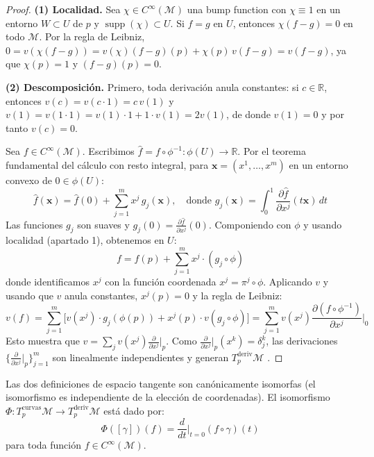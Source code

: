 \begin{proof}
\textbf{(1) Localidad.} Sea $\chi \in C^\infty(\mathcal{M})$ una bump function con $\chi \equiv 1$ en un entorno $W \subset U$ de $p$ y $\operatorname{supp}(\chi) \subset U$. Si $f = g$ en $U$, entonces $\chi(f - g) = 0$ en todo $\mathcal{M}$. Por la regla de Leibniz, $0 = v(\chi(f-g)) = v(\chi)(f-g)(p) + \chi(p) \, v(f-g) = v(f-g)$, ya que $\chi(p) = 1$ y $(f-g)(p) = 0$.

\textbf{(2) Descomposición.} Primero, toda derivación anula constantes: si $c \in \mathbb{R}$, entonces $v(c) = v(c \cdot 1) = c \, v(1)$ y $v(1) = v(1 \cdot 1) = v(1) \cdot 1 + 1 \cdot v(1) = 2v(1)$, de donde $v(1) = 0$ y por tanto $v(c) = 0$.

Sea $f \in C^\infty(\mathcal{M})$. Escribimos $\hat{f} = f \circ \phi^{-1}: \phi(U) \to \mathbb{R}$. Por el teorema fundamental del cálculo con resto integral, para $\mathbf{x} = (x^1, \ldots, x^m)$ en un entorno convexo de $0 \in \phi(U)$:
\[
\hat{f}(\mathbf{x}) = \hat{f}(0) + \sum_{j=1}^{m} x^j \, g_j(\mathbf{x}), \quad \text{donde } g_j(\mathbf{x}) = \int_0^1 \frac{\partial \hat{f}}{\partial x^j}(t\mathbf{x}) \, dt
\]
Las funciones $g_j$ son suaves y $g_j(0) = \frac{\partial \hat{f}}{\partial x^j}(0)$. Componiendo con $\phi$ y usando localidad (apartado 1), obtenemos en $U$:
\[
f = f(p) + \sum_{j=1}^{m} x^j \cdot (g_j \circ \phi)
\]
donde identificamos $x^j$ con la función coordenada $x^j = \pi^j \circ \phi$. Aplicando $v$ y usando que $v$ anula constantes, $x^j(p) = 0$ y la regla de Leibniz:
\[
v(f) = \sum_{j=1}^{m} \bigl[v(x^j) \cdot g_j(\phi(p)) + x^j(p) \cdot v(g_j \circ \phi)\bigr] = \sum_{j=1}^{m} v(x^j) \frac{\partial(f \circ \phi^{-1})}{\partial x^j}\bigg|_{0}
\]
Esto muestra que $v = \sum_j v(x^j) \frac{\partial}{\partial x^j}\big|_p$. Como $\frac{\partial}{\partial x^j}\big|_p(x^k) = \delta_j^k$, las derivaciones $\{\frac{\partial}{\partial x^j}\big|_p\}_{j=1}^m$ son linealmente independientes y generan $T_p^{\text{deriv}}\mathcal{M}$ \citep[Proposition 3.2]{lee2012introduction}.
\end{proof}

\begin{proposition}\label{prop:equivalencia_espacio_tangente}
Las dos definiciones de espacio tangente son canónicamente isomorfas (el isomorfismo es independiente de la elección de coordenadas). El isomorfismo $\Phi: T_p^{\text{curvas}}\mathcal{M} \to T_p^{\text{deriv}}\mathcal{M}$ está dado por:
\[
\Phi([\gamma])(f) = \frac{d}{dt}\bigg|_{t=0} (f \circ \gamma)(t)
\]
para toda función $f \in C^\infty(\mathcal{M})$.
\end{proposition}

